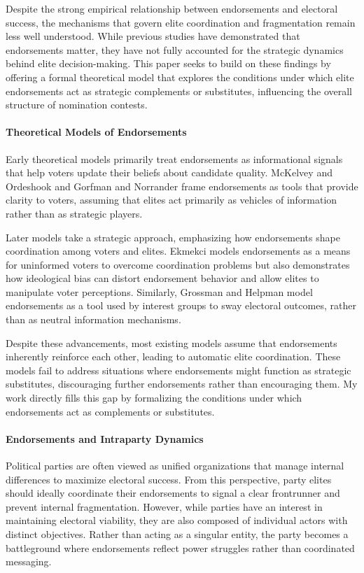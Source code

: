 Despite the strong empirical relationship between endorsements and electoral success, the mechanisms that govern elite coordination and fragmentation remain less well understood. While previous studies have demonstrated that endorsements matter, they have not fully accounted for the strategic dynamics behind elite decision-making. This paper seeks to build on these findings by offering a formal theoretical model that explores the conditions under which elite endorsements act as strategic complements or substitutes, influencing the overall structure of nomination contests.

\paragraph{Theoretical Models of Endorsements}
Early theoretical models primarily treat endorsements as informational signals that help voters update their beliefs about candidate quality. McKelvey and Ordeshook \parencite*{McKelvey195} and Gorfman and Norrander \parencite*{Grofman1990} frame endorsements as tools that provide clarity to voters, assuming that elites act primarily as vehicles of information rather than as strategic players.

Later models take a strategic approach, emphasizing how endorsements shape coordination among voters and elites. Ekmekci \parencite*{Ekmekci2009} models endorsements as a means for uninformed voters to overcome coordination problems but also demonstrates how ideological bias can distort endorsement behavior and allow elites to manipulate voter perceptions. Similarly, Grossman and Helpman \parencite*{Grossman1999} model endorsements as a tool used by interest groups to sway electoral outcomes, rather than as neutral information mechanisms.

Despite these advancements, most existing models assume that endorsements inherently reinforce each other, leading to automatic elite coordination. These models fail to address situations where endorsements might function as strategic substitutes, discouraging further endorsements rather than encouraging them. My work directly fills this gap by formalizing the conditions under which endorsements act as complements or substitutes.

\paragraph{Endorsements and Intraparty Dynamics} Political parties are often viewed as unified organizations that manage internal differences to maximize electoral success. From this perspective, party elites should ideally coordinate their endorsements to signal a clear frontrunner and prevent internal fragmentation. However, while parties have an interest in maintaining electoral viability, they are also composed of individual actors with distinct objectives. Rather than acting as a singular entity, the party becomes a battleground where endorsements reflect power struggles rather than coordinated messaging.

